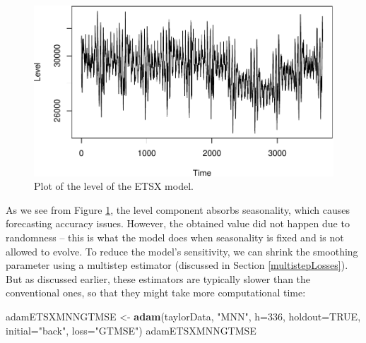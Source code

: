 \documentclass[]{book}
\newenvironment{Shaded}{\begin{snugshade}}{\end{snugshade}}
\newcommand{\DataTypeTok}[1]{\textcolor[rgb]{0.13,0.29,0.53}{#1}}
\newcommand{\DecValTok}[1]{\textcolor[rgb]{0.00,0.00,0.81}{#1}}
\newcommand{\KeywordTok}[1]{\textcolor[rgb]{0.13,0.29,0.53}{\textbf{#1}}}
\newcommand{\NormalTok}[1]{#1}
\newcommand{\OperatorTok}[1]{\textcolor[rgb]{0.81,0.36,0.00}{\textbf{#1}}}
\newcommand{\OtherTok}[1]{\textcolor[rgb]{0.56,0.35,0.01}{#1}}
\newcommand{\StringTok}[1]{\textcolor[rgb]{0.31,0.60,0.02}{#1}}
\theoremstyle{definition}
\theoremstyle{definition}
\theoremstyle{definition}
\theoremstyle{definition}
\theoremstyle{remark}
\begin{document}
\begin{Shaded}
\end{Shaded}

\begin{figure}
\centering
\includegraphics{Svetunkov--2022----ADAM_files/figure-latex/adamETSXMNN121-1.pdf}
\caption{\label{fig:adamETSXMNN121}Plot of the level of the ETSX model.}
\end{figure}

As we see from Figure \ref{fig:adamETSXMNN121}, the level component absorbs seasonality, which causes forecasting accuracy issues. However, the obtained value did not happen due to randomness -- this is what the model does when seasonality is fixed and is not allowed to evolve. To reduce the model's sensitivity, we can shrink the smoothing parameter using a multistep estimator (discussed in Section \ref{multistepLosses}). But as discussed earlier, these estimators are typically slower than the conventional ones, so that they might take more computational time:

\begin{Shaded}
\begin{Highlighting}[]
\NormalTok{adamETSXMNNGTMSE <-}\StringTok{ }\KeywordTok{adam}\NormalTok{(taylorData, }\StringTok{"MNN"}\NormalTok{,}
                         \DataTypeTok{h=}\DecValTok{336}\NormalTok{, }\DataTypeTok{holdout=}\OtherTok{TRUE}\NormalTok{,}
                         \DataTypeTok{initial=}\StringTok{"back"}\NormalTok{, }\DataTypeTok{loss=}\StringTok{"GTMSE"}\NormalTok{)}
\NormalTok{adamETSXMNNGTMSE}
\end{Highlighting}
\end{Shaded}
\end{document}
